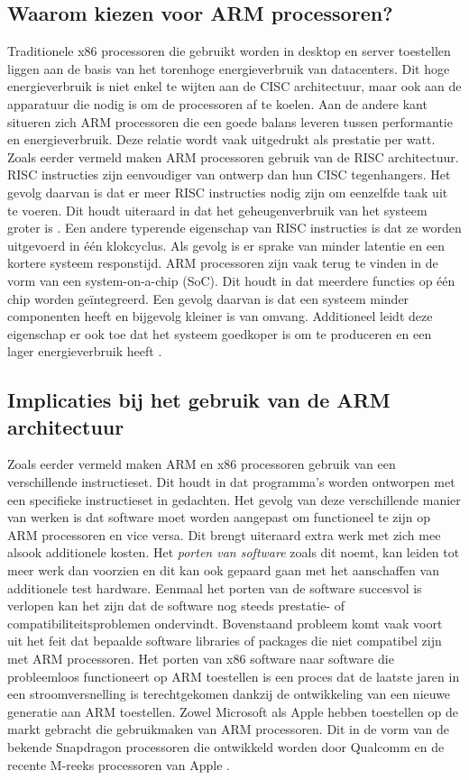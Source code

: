 \subsection{Waarom kiezen voor ARM processoren?}
Traditionele x86 processoren die gebruikt worden in desktop en server toestellen liggen aan de basis van het torenhoge energieverbruik van datacenters. Dit hoge energieverbruik is niet enkel te wijten aan de CISC architectuur, maar ook aan de apparatuur die nodig is om de processoren af te koelen. Aan de andere kant situeren zich ARM processoren die een goede balans leveren tussen performantie en energieverbruik. Deze relatie wordt vaak uitgedrukt als prestatie per watt. Zoals eerder vermeld maken ARM processoren gebruik van de RISC architectuur. RISC instructies zijn eenvoudiger van ontwerp dan hun CISC tegenhangers. Het gevolg daarvan is dat er meer RISC instructies nodig zijn om eenzelfde taak uit te voeren. Dit houdt uiteraard in dat het geheugenverbruik van het systeem groter is \autocite{Aroca2012}. Een andere typerende eigenschap van RISC instructies is dat ze worden uitgevoerd in één klokcyclus. Als gevolg is er sprake van minder latentie en een kortere systeem responstijd. ARM processoren zijn vaak terug te vinden in de vorm van een system-on-a-chip (SoC). Dit houdt in dat meerdere functies op één chip worden geïntegreerd. Een gevolg daarvan is dat een systeem minder componenten heeft en bijgevolg kleiner is van omvang. Additioneel leidt deze eigenschap er ook toe dat het systeem goedkoper is om te produceren en een lager energieverbruik heeft \autocite{Ravali2016}.

\subsection{Implicaties bij het gebruik van de ARM architectuur}
Zoals eerder vermeld maken ARM en x86 processoren gebruik van een verschillende instructieset. Dit houdt in dat programma’s worden ontworpen met een specifieke instructieset in gedachten. Het gevolg van deze verschillende manier van werken is dat software moet worden aangepast om functioneel te zijn op ARM processoren en vice versa. Dit brengt uiteraard extra werk met zich mee alsook additionele kosten. Het \textit{porten van software} zoals dit noemt, kan leiden tot meer werk dan voorzien en dit kan ook gepaard gaan met het aanschaffen van additionele test hardware. Eenmaal het porten van de software succesvol is verlopen kan het zijn dat de software nog steeds prestatie- of compatibiliteitsproblemen ondervindt. Bovenstaand probleem komt vaak voort uit het feit dat bepaalde software libraries of packages die niet compatibel zijn met ARM processoren. Het porten van x86 software naar software die probleemloos functioneert op ARM toestellen is een proces dat de laatste jaren in een stroomversnelling is terechtgekomen dankzij de ontwikkeling van een nieuwe generatie aan ARM toestellen. Zowel Microsoft als Apple hebben toestellen op de markt gebracht die gebruikmaken van ARM processoren. Dit in de vorm van de bekende Snapdragon processoren die ontwikkeld worden door Qualcomm en de recente M-reeks processoren van Apple \autocite{Ford2021}.

